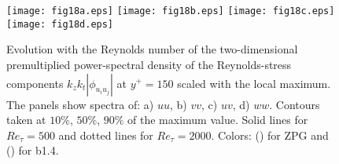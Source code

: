 \begin{figure}
\texttt{[image: fig18a.eps]}
\texttt{[image: fig18b.eps]}
\texttt{[image: fig18c.eps]}
\texttt{[image: fig18d.eps]}
  \caption{Evolution with the Reynolds number of the two-dimensional premultiplied power-spectral density of the Reynolds-stress components $k_z k_t |\phi_{u_iu_j}|$ at $y^+=150$ scaled with the local maximum. The panels show spectra of: a) $uu$, b) $vv$, c) $uv$, d) $ww$. Contours taken at $10\%$, $50\%$, $90\%$ of the maximum value. Solid lines for $Re_{\tau}=500$ and dotted lines for $Re_{\tau}=2000$. Colors: (\protect\blackline) for ZPG and (\protect\orangeline) for b1.4.}
\label{fig:spec2Duiuj_150}
\end{figure}


